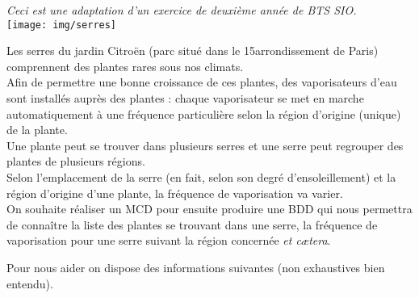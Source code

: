 \documentclass[a4paper,12pt,french]{article}
\begin{document}


\begin{center}
\textit{Ceci est une adaptation d'un exercice de deuxième année de BTS SIO.}\\[2em]

\texttt{[image: img/serres]}
\end{center}
Les serres du jardin Citroën (parc situé dans le 15\eme arrondissement de Paris) comprennent des plantes rares sous nos climats.\\
Afin de permettre une bonne croissance de ces plantes, des vaporisateurs d'eau sont installés auprès des plantes : chaque vaporisateur se met en marche automatiquement à une fréquence particulière selon la région d'origine (unique) de la plante.\\
Une plante peut se trouver dans plusieurs serres et une serre peut regrouper des plantes de plusieurs régions.\\
Selon l'emplacement de la serre (en fait, selon son degré d'ensoleillement) et la région d'origine d'une plante, la fréquence de vaporisation va varier.\\
On souhaite réaliser un MCD pour ensuite produire une BDD qui nous permettra de connaître la liste des plantes se trouvant dans une serre, la fréquence de vaporisation pour une serre suivant la région concernée \textit{et c\ae tera}.

Pour nous aider on dispose des informations suivantes (non exhaustives bien entendu).
\end{document}
